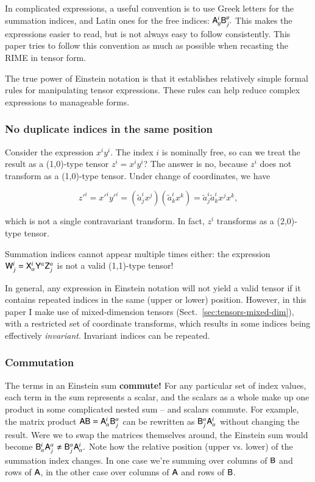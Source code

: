 \documentclass[]{aa}
\begin{document}
In complicated expressions, a useful convention is to use Greek letters for the summation indices, and Latin ones for the free indices:  $\mathsf{A}_{\theta}^{i}\mathsf{B}_{j}^{\theta}.$ This makes the expressions easier to read, but is not always easy to follow consistently. 
This paper tries to follow this convention as much as possible when recasting the RIME in tensor form.

The true power of Einstein notation is that it establishes relatively simple formal rules for manipulating tensor expressions. These rules
can help reduce complex expressions to manageable forms. 

\subsubsection{No duplicate indices in the same position}

Consider the expression $x^i y^i$. The index $i$ is nominally free, so can we treat the result as a (1,0)-type tensor $z^i = x^i y^i$? The answer is no, because $z^i$ does not transform as a (1,0)-type tensor. Under change of coordinates, we have

\[
  z'^i = x'^i y'^i = (\tilde a^i_j x^j) (\tilde a^i_k x^k) = \tilde a^i_j \tilde a^i_k x^j x^k, 
\]

which is not a single contravariant transform. In fact, $z^i$ transforms as a (2,0)-type tensor. 

Summation indices cannot appear multiple times either: the expression $\mathsf{W}^i_j = \mathsf{X}^i_\alpha \mathsf{Y}^\alpha \mathsf{Z}^\alpha_j$ is not a valid (1,1)-type tensor!

In general, any expression in Einstein notation will not yield a valid tensor if it contains repeated indices in the same (upper or lower) position. However, in this paper I make use of mixed-dimension tensors (Sect.~\ref{sec:tensors-mixed-dim}), with a restricted set of coordinate transforms, which results in some indices being effectively \emph{invariant}. Invariant indices can be repeated.

\subsubsection{Commutation}
\label{sec:einstein-commutation}
 
The terms in an Einstein sum \textbf{commute!} For any particular set of index values, each term in the sum represents a scalar, and the scalars as a whole make up one product in some complicated nested sum -- and scalars commute. For example, the matrix product $\mathsf{AB}=\mathsf{A}_\alpha^i \mathsf{B}_j^\alpha$ can be rewritten as $\mathsf{B}_{j}^{\alpha}\mathsf{A}_{\alpha}^{i}$ without changing the result. Were we to swap the matrices themselves around, the Einstein sum would become $\mathsf{B}_{\alpha}^{i}\mathsf{A}_{j}^{\alpha}\neq\mathsf{B}_{j}^{\alpha}\mathsf{A}_{\alpha}^{i}.$ Note how the relative position (upper vs. lower) of the summation index changes. In one case we're summing over columns of $\mathsf{B}$ and rows of $\mathsf{A}$, in the other case over columns of $\mathsf{A}$ and rows of $\mathsf{B}$. 
\end{document}
